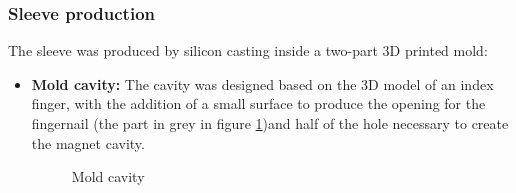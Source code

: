 \subsubsection{Sleeve production}
\label{sec: Sleeve_production}
The sleeve was produced by silicon casting inside a two-part 3D printed mold:
\begin{itemize}
    \item \textbf{Mold cavity: } The cavity was designed based on the 3D model of an index finger, with the addition of a small surface to produce the opening for the fingernail (the part in grey in figure \ref{fig: mold_cavity})and half of the hole necessary to create the magnet cavity.
    \begin{figure}
        \centering
        \caption{Mold cavity}
        \label{fig: mold_cavity}
    \end{figure}


\end{itemize}
